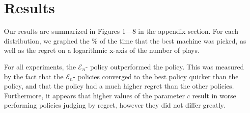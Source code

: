 
\section{Results}
\label{sec:results}

Our results are summarized in Figures 1---8 in the appendix
section. For each distribution, we graphed the \% of the time that the
best machine was picked, as well as the regret on a logarithmic x-axis
of the number of plays.

For all experiments, the $\mathcal{E}_n$- policy
outperformed the  policy. This was measured by the fact
that the $\mathcal{E}_n$- policies converged to the
best policy quicker than the  policy, and that the
 policy had a much higher regret than the other
policies. Furthermore, it appears that higher values of the parameter
$c$ result in worse performing policies judging by regret, however
they did not differ greatly.
